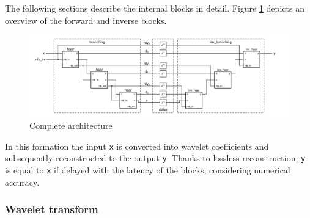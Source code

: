 \begin{refsection}
The following sections describe the internal blocks in detail.
Figure \ref{fpga:fig:mainDelay} depicts an overview of the forward and inverse blocks.
\begin{figure} %
	\centering
	\includegraphics[width=\textwidth]{papers/fpga/images/main_delay.pdf}
	\caption{Complete architecture \label{fpga:fig:mainDelay}}
\end{figure}
In this formation the input \texttt{x} is converted into wavelet coefficients and subsequently reconstructed to the output \texttt{y}.
Thanks to lossless reconstruction, \texttt{y} is equal to \texttt{x} if delayed with the latency of the blocks, considering numerical accuracy.

\subsubsection{Wavelet transform}


\end{refsection}
